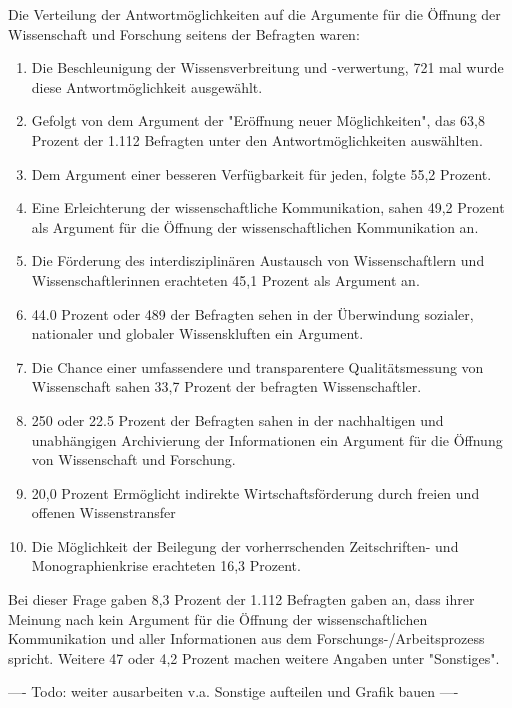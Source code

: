 Die Verteilung der Antwortmöglichkeiten auf die Argumente für die Öffnung der Wissenschaft und Forschung seitens der Befragten waren:
\begin{enumerate}
\item Die Beschleunigung der Wissensverbreitung und -verwertung, 721 mal wurde diese Antwortmöglichkeit ausgewählt.
\item Gefolgt von dem Argument der "Eröffnung neuer Möglichkeiten", das 63,8 Prozent der 1.112 Befragten unter den Antwortmöglichkeiten auswählten.
\item Dem Argument einer besseren Verfügbarkeit für jeden, folgte 55,2 Prozent.
\item Eine Erleichterung der wissenschaftliche Kommunikation, sahen 49,2 Prozent als Argument für die Öffnung der wissenschaftlichen Kommunikation an.
\item Die Förderung des interdisziplinären Austausch von Wissenschaftlern und Wissenschaftlerinnen erachteten 45,1 Prozent als Argument an.
\item 44.0 Prozent oder 489 der Befragten sehen in der Überwindung sozialer, nationaler und globaler Wissenskluften ein Argument.
\item Die Chance einer umfassendere und transparentere Qualitätsmessung von Wissenschaft sahen 33,7 Prozent der befragten Wissenschaftler.
\item 250 oder 22.5 Prozent der Befragten sahen in der nachhaltigen und unabhängigen Archivierung der Informationen ein Argument für die Öffnung von Wissenschaft und Forschung.
\item 20,0 Prozent Ermöglicht indirekte Wirtschaftsförderung durch freien und offenen Wissenstransfer
\item Die Möglichkeit der Beilegung der vorherrschenden Zeitschriften- und Monographienkrise erachteten 16,3 Prozent.
\end{enumerate}

Bei dieser Frage gaben 8,3 Prozent der 1.112 Befragten gaben an, dass ihrer Meinung nach kein Argument für die Öffnung der wissenschaftlichen Kommunikation und aller Informationen aus dem Forschungs-/Arbeitsprozess spricht. Weitere 47 oder 4,2 Prozent machen weitere Angaben unter "Sonstiges".

---- Todo: weiter ausarbeiten v.a. Sonstige aufteilen und Grafik bauen ----

